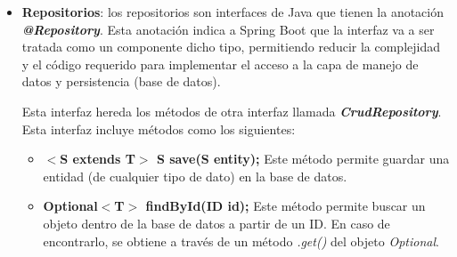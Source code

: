 \begin{itemize}
\begin{verbatim}
                return ResponseEntity
                    .status(HttpStatus.INTERNAL_SERVER_ERROR)
                    .body(error);
            }

            @ExceptionHandler({
                ConfirmTokenNotExistsException.class,
                RoleNotExistsException.class,
                UserNotFoundException.class,
                EntityNotFoundException.class
            })
            public ResponseEntity<ErrorDto> entityNotExists(
                Exception ex
            ) {
                ErrorDto error = new ErrorDto(
                    "La entidad no existe en la base de datos", 
                    ex.getMessage(), 
                    HttpStatus.NOT_FOUND.value()
                );

                return ResponseEntity.status(HttpStatus.NOT_FOUND)
                    .body(error);
            }

            ...
        }
    \end{verbatim}

    Este controlador le indica a Spring Boot que es el encargado de manejar las excepciones a través de la anotación 
    \textbf{\textit{@RestControllerAdvice}}. Con la anotación \textbf{\textit{@ExceptionHandler}} se va indicar qué
    tipo de excepción va a tratar el método y que respuesta va a devolver. Las respuestas tienen la misma estructura 
    a través de un DTO (explicado a continuación) llamado ``ErrorDto''.

    \item \textbf{Repositorios}: los repositorios son interfaces de Java que tienen la anotación \textbf{\textit{@Repository}}.
    Esta anotación indica a Spring Boot que la interfaz va a ser tratada como un componente dicho tipo, permitiendo reducir la
    complejidad y el código requerido para implementar el acceso a la capa de manejo de datos y persistencia (base de datos). 
    
    Esta interfaz hereda los métodos de otra interfaz llamada \textbf{\textit{CrudRepository}}. Esta interfaz incluye métodos 
    como los siguientes:

    \begin{itemize}
        \item \textbf{$<$S extends T$>$ S save(S entity);}
        Este método permite guardar una entidad (de cualquier tipo de dato) en la base de datos.

        \item \textbf{Optional$<$T$>$ findById(ID id);}
        Este método permite buscar un objeto dentro de la base de datos a partir de un ID. En caso de encontrarlo, se obtiene 
        a través de un método \textit{.get()} del objeto \textit{Optional}.


\end{itemize}
\end{itemize}
